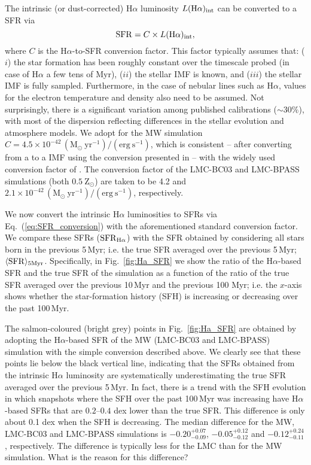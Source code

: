 \documentclass[fleqn,usenatbib]{mnras}
\begin{document}
The intrinsic (or dust-corrected) H$\alpha$ luminosity $L(\mathrm{H}\alpha)_{\rm int}$ can be converted to a SFR via
\begin{equation}
    \mathrm{SFR} = C \times L(\mathrm{H}\alpha)_{\rm int},
\label{eq:SFR_conversion}
\end{equation}
\noindent
where $C$ is the H$\alpha$-to-SFR conversion factor. This factor typically assumes that: ($i$) the star formation has been roughly constant over the timescale probed (in case of H$\alpha$ a few tens of Myr), ($ii$) the stellar IMF is known, and ($iii$) the stellar IMF is fully sampled. Furthermore, in the case of nebular lines such as H$\alpha$, values for the electron temperature and density also need to be assumed. Not surprisingly, there is a significant variation among published calibrations ($\sim30\%$), with most of the dispersion reflecting differences in the stellar evolution and atmosphere models. We adopt for the MW simulation $C=4.5\times10^{-42}\,(\text{M}_{\odot}~\mathrm{yr}^{-1})/(\mathrm{erg}~\mathrm{s}^{-1})$, which is consistent -- after converting from a \citet{salpeter55} to a \citet{chabrier03} IMF using the conversion presented in \citet{driver13} -- with the widely used conversion factor of \citet{kennicutt98}. The conversion factor of the LMC-BC03 and LMC-BPASS simulations (both $0.5~\mathrm{Z}_{\odot}$) are taken to be 4.2 and $2.1\times10^{-42}\,(\text{M}_{\odot}~\mathrm{yr}^{-1})/(\mathrm{erg}~\mathrm{s}^{-1})$, respectively. 

We now convert the intrinsic H$\alpha$ luminosities to SFRs via Eq.~(\ref{eq:SFR_conversion}) with the aforementioned standard \citet{kennicutt98} conversion factor. We compare these SFRs ($\mathrm{SFR}_{\rm H\alpha}$) with the SFR obtained by considering all stars born in the previous 5\,Myr; i.e. the true SFR averaged over the previous 5\,Myr; $\langle\mathrm{SFR}\rangle_{\rm 5 Myr}$. Specifically, in Fig.~\ref{fig:Ha_SFR} we show the ratio of the H$\alpha$-based SFR and the true SFR of the simulation as a function of the ratio of the true SFR averaged over the previous 10\,Myr and the previous 100 Myr; i.e. the $x$-axis shows whether the star-formation history (SFH) is increasing or decreasing over the past 100\,Myr.

The salmon-coloured (bright grey) points in Fig.~\ref{fig:Ha_SFR} are obtained by adopting the H$\alpha$-based SFR of the MW (LMC-BC03 and LMC-BPASS) simulation with the simple conversion described above. We clearly see that these points lie below the black vertical line, indicating that the SFRs obtained from the intrinsic H$\alpha$ luminosity are systematically underestimating the true SFR averaged over the previous 5\,Myr. In fact, there is a trend with the SFH evolution in which snapshots where the SFH over the past 100\,Myr was increasing have H$\alpha$-based SFRs that are $0.2$--$0.4$ dex lower than the true SFR. This difference is only about 0.1 dex when the SFH is decreasing. The median difference for the MW, LMC-BC03 and LMC-BPASS simulations is $-0.20_{-0.09}^{+0.07}$, $-0.05_{-0.12}^{+0.12}$ and $-0.12_{-0.11}^{+0.24}$, respectively. The difference is typically less for the LMC than for the MW simulation. What is the reason for this difference?
\end{document}
